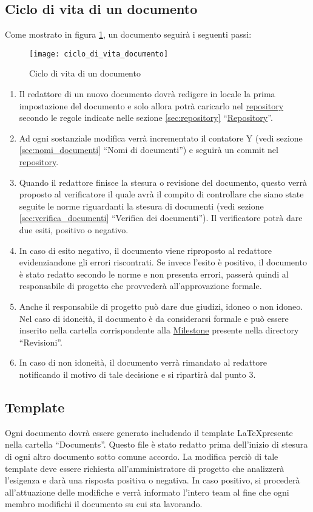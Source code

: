 \subsection{Ciclo di vita di un documento}
Come mostrato in figura \ref{fig:ciclo_di_vita_documento}, un documento seguirà i seguenti passi:
\begin{figure}[h]
\centering
\texttt{[image: ciclo\_di\_vita\_documento]}
\caption{Ciclo di vita di un documento} \label{fig:ciclo_di_vita_documento}
\end{figure}
\begin{enumerate}
\item Il redattore di un nuovo documento dovrà redigere in locale la prima impostazione del documento e solo allora potrà caricarlo nel \underline{repository} secondo le regole indicate nelle sezione \ref{sec:repository} ``\underline{Repository}''.
\item Ad ogni sostanziale modifica verrà incrementato il contatore Y (vedi sezione \ref{sec:nomi_documenti} ``Nomi di documenti'') e seguirà un commit nel \underline{repository}.
\item Quando il redattore finisce la stesura o revisione del documento, questo verrà proposto al verificatore il quale avrà il compito di controllare che siano state seguite le norme riguardanti la stesura di documenti (vedi sezione \ref{sec:verifica_documenti} ``Verifica dei documenti''). Il verificatore potrà dare due esiti, positivo o negativo.
\item
In caso di esito negativo, il documento viene riproposto al redattore evidenziandone gli errori riscontrati. Se invece l'esito è positivo, il documento è stato redatto secondo le norme e non presenta errori, passerà quindi al responsabile di progetto che provvederà all'approvazione formale.
\item Anche il responsabile di progetto può dare due giudizi, idoneo o non idoneo. Nel caso di idoneità, il documento è da considerarsi formale e può essere inserito nella cartella corrispondente alla \underline{Milestone} presente nella directory ``Revisioni''.
\item In caso di non idoneità, il documento verrà rimandato al redattore notificando il motivo di tale decisione e si ripartirà dal punto 3.
\end{enumerate}

\subsection{Template}
Ogni documento dovrà essere generato includendo il template \LaTeX presente nella cartella ``Documents''. Questo file è stato redatto prima dell'inizio di stesura di ogni altro documento sotto comune accordo. La modifica perciò di tale template deve essere richiesta all'amministratore di progetto che analizzerà l'esigenza e darà una risposta positiva o negativa. In caso positivo, si procederà all'attuazione delle modifiche e verrà informato l'intero team al fine che ogni membro modifichi il documento su cui sta lavorando.

